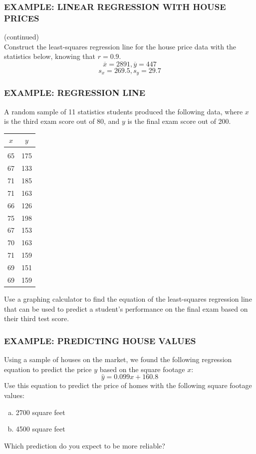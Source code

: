 \documentclass[8pt]{beamer}
\newcommand{\extitle}[1]{\frametitle{\fontfamily{fvs}\selectfont \small\color{black!70!blue!80!cyan}\uppercase{\bfseries Example: #1}}}
\def\solblank{\begin{tcolorbox}[colframe=black!50!blue!50!cyan,
colback=white,
bottomrule=0mm,
rightrule=0mm,
sharp corners=all] 
\vspace{6in}
\text{}
\end{tcolorbox}}
\begin{document}
\begin{frame}
\extitle{Linear Regression with House Prices}
(continued)\\
Construct the least-squares regression line for the house price data with the statistics below, knowing that $r=0.9$.
\[\overline{x} = 2891, \overline{y} = 447\]
\[s_x = 269.5, s_y = 29.7\]

\solblank
\end{frame}

\begin{frame}
\extitle{Regression Line}
A random sample of 11 statistics students produced the following data, where $x$ is the third exam score out of 80, and $y$ is the final exam score out of 200.
\begin{center}
\begin{tabular}{c c}
$x$ & $y$\\
\hline
\\
65 & 175\\
67 & 133\\
71 & 185\\
71 & 163\\
66 & 126\\
75 & 198\\
67 & 153\\
70 & 163\\
71 & 159\\
69 & 151\\
69 & 159
\end{tabular}
\end{center}

Use a graphing calculator to find the equation of the least-squares regression line that can be used to predict a student's performance on the final exam based on their third test score.
\end{frame}

\begin{frame}
\extitle{Predicting House Values}
Using a sample of houses on the market, we found the following regression equation to predict the price $y$ based on the square footage $x$:
\[\hat{y} = 0.099x + 160.8\]
Use this equation to predict the price of homes with the following square footage values:
\begin{enumerate}[(a)]
\item 2700 square feet
\item 4500 square feet
\end{enumerate}
Which prediction do you expect to be more reliable?

\solblank
\end{frame}
\end{document}
